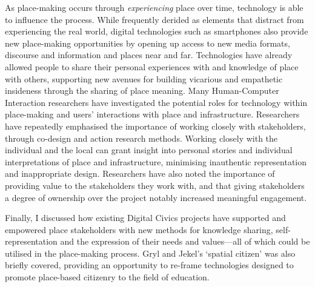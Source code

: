 As place-making occurs through \textit{experiencing} place over time, technology is able to influence the process. While frequently derided as elements that distract from experiencing the real world, digital technologies such as smartphones also provide new place-making opportunities by opening up access to new media formats, discourse and information and places near and far. Technologies have already allowed people to share their personal experiences with and knowledge of place with others, supporting new avenues for building vicarious and empathetic insideness through the sharing of place meaning. Many Human-Computer Interaction researchers have investigated the potential roles for technology within place-making and users' interactions with place and infrastructure. Researchers have repeatedly emphasised the importance of working closely with stakeholders, through co-design and action research methods. Working closely with the individual and the local can grant insight into personal stories and individual interpretations of place and infrastructure, minimising inauthentic representation and inappropriate design. Researchers have also noted the importance of providing value to the stakeholders they work with, and that giving stakeholders a degree of ownership over the project notably increased meaningful engagement.

Finally, I discussed how existing Digital Civics projects have supported and empowered place stakeholders with new methods for knowledge sharing, self-representation and the expression of their needs and values---all of which could be utilised in the place-making process. Gryl and Jekel's `spatial citizen' was also briefly covered, providing an opportunity to re-frame technologies designed to promote place-based citizenry to the field of education.